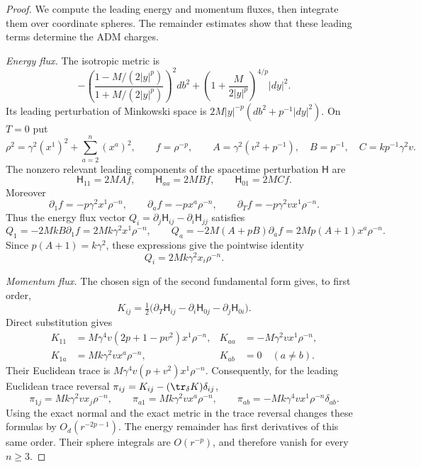 \begin{proof}
We compute the leading energy and momentum fluxes, then integrate them
over coordinate spheres.  The remainder estimates show that these
leading terms determine the ADM charges.

\emph{Energy flux.} The isotropic metric is
\[
 -\left(\frac{1-M/(2|y|^p)}{1+M/(2|y|^p)}\right)^2db^2
 +\left(1+\frac{M}{2|y|^p}\right)^{4/p}|dy|^2.
\]
Its leading perturbation of Minkowski space is
$2M|y|^{-p}(db^2+p^{-1}|dy|^2)$.  On $T=0$ put
\begin{equation}\label{eq:end:boost-leading-parameters}
 \rho^2=\gamma^2(x^1)^2+\sum_{a=2}^n(x^a)^2,\qquad f=\rho^{-p},
 \qquad A=\gamma^2(v^2+p^{-1}),\quad B=p^{-1},\quad
 C=kp^{-1}\gamma^2v.
\end{equation}
The nonzero relevant leading components of the spacetime perturbation
$\mathsf H$ are
\begin{equation}\label{eq:end:boost-leading-components}
 \mathsf H_{11}=2MAf,\qquad \mathsf H_{aa}=2MBf,\qquad
 \mathsf H_{01}=2MCf.
\end{equation}
Moreover
\[
 \partial_1f=-p\gamma^2x^1\rho^{-n},\qquad
 \partial_af=-px^a\rho^{-n},\qquad
 \partial_Tf=-p\gamma^2vx^1\rho^{-n}.
\]
Thus the energy flux vector $Q_i=\partial_j\mathsf H_{ij}
-\partial_i\mathsf H_{jj}$ satisfies
\[
 Q_1=-2MkB\partial_1f=2Mk\gamma^2x^1\rho^{-n},\qquad
 Q_a=-2M(A+pB)\partial_af=2Mp(A+1)x^a\rho^{-n}.
\]
Since $p(A+1)=k\gamma^2$, these expressions give the pointwise identity
\begin{equation}\label{eq:end:boost-energy-vector}
 Q_i=2Mk\gamma^2x_i\rho^{-n}.
\end{equation}

\emph{Momentum flux.} The chosen sign of the second fundamental form
gives, to first order,
\[
 K_{ij}=\tfrac12\bigl(\partial_T\mathsf H_{ij}
                 -\partial_i\mathsf H_{0j}
                 -\partial_j\mathsf H_{0i}\bigr).
\]
Direct substitution gives
\begin{equation}\label{eq:end:boost-leading-K}
\begin{aligned}
 K_{11}&=M\gamma^4v(2p+1-pv^2)x^1\rho^{-n},&
 K_{aa}&=-M\gamma^2vx^1\rho^{-n},\\
 K_{1a}&=Mk\gamma^2vx^a\rho^{-n},&
 K_{ab}&=0\quad(a\ne b).
\end{aligned}
\end{equation}
Their Euclidean trace is
$M\gamma^4v(p+v^2)x^1\rho^{-n}$.  Consequently, for the leading
Euclidean trace reversal $\pi_{ij}=K_{ij}-(\tr_\delta K)\delta_{ij}$,
\begin{equation}\label{eq:end:boost-momentum-tensor}
 \pi_{1j}=Mk\gamma^2v x_j\rho^{-n},\qquad
 \pi_{a1}=Mk\gamma^2vx^a\rho^{-n},\qquad
 \pi_{ab}=-Mk\gamma^4vx^1\rho^{-n}\delta_{ab}.
\end{equation}
Using the exact normal and the exact metric in the trace reversal
changes these formulas by $O_d(r^{-2p-1})$.  The energy remainder
has first derivatives of this same order.  Their sphere integrals
are $O(r^{-p})$, and therefore vanish for every $n\ge3$.


\end{proof}
